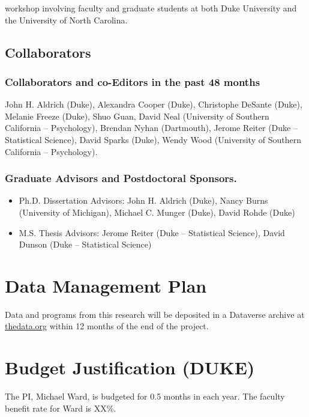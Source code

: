 \documentclass[pdftex,12pt,fullpage,oneside]{amsart}
\begin{document}
workshop involving faculty and graduate students at both Duke
University and the University of North Carolina.  

\subsection*{Collaborators}

\subsubsection*{Collaborators and co-Editors in the past 48 months}
John H. Aldrich (Duke), Alexandra Cooper (Duke), Christophe DeSante
(Duke), Melanie Freeze (Duke), Shuo Guan, David Neal (University of Southern
California -- Psychology), Brendan Nyhan (Dartmouth), Jerome Reiter
(Duke -- Statistical Science), David Sparks (Duke), Wendy Wood
(University of Southern California -- Psychology).

\subsubsection*{Graduate Advisors and Postdoctoral Sponsors.}
\begin{itemize}
\item[] Ph.D. Dissertation Advisors: John H. Aldrich (Duke), Nancy Burns
  (University of Michigan), Michael C. Munger (Duke), David Rohde (Duke)
\item[] M.S. Thesis Advisors: Jerome Reiter (Duke -- Statistical Science), David Dunson
  (Duke -- Statistical Science)
\end{itemize}

\newpage
\setcounter{page}{1}
\thispagestyle{empty}

\section*{Data Management Plan}

\noindent Data and programs from this research will be deposited in a Dataverse archive at \url{thedata.org} within 12 months of the end of the project.

\newpage
\setcounter{page}{1}
\thispagestyle{empty}

\section*{Budget Justification (DUKE)}

The PI, Michael Ward, is budgeted for 0.5 months in each year.  The
faculty benefit rate for Ward is XX\%.   
\end{document}
